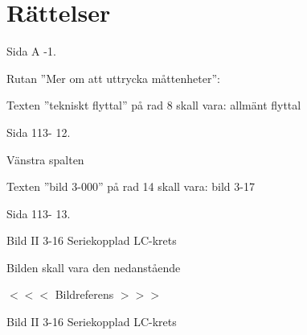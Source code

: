 \section{Rättelser}

\onecolumn

Sida A -1.

Rutan ''Mer om att uttrycka måttenheter'':

Texten ''tekniskt flyttal'' på rad 8 skall vara: allmänt flyttal

Sida 113- 12.

Vänstra spalten

Texten ''bild 3-000'' på rad 14 skall vara: bild 3-17

Sida 113- 13.

Bild II 3-16 Seriekopplad LC-krets

Bilden skall vara den nedanstående

$<<<$ Bildreferens $>>>$

Bild II 3-16 Seriekopplad LC-krets

\twocolumn